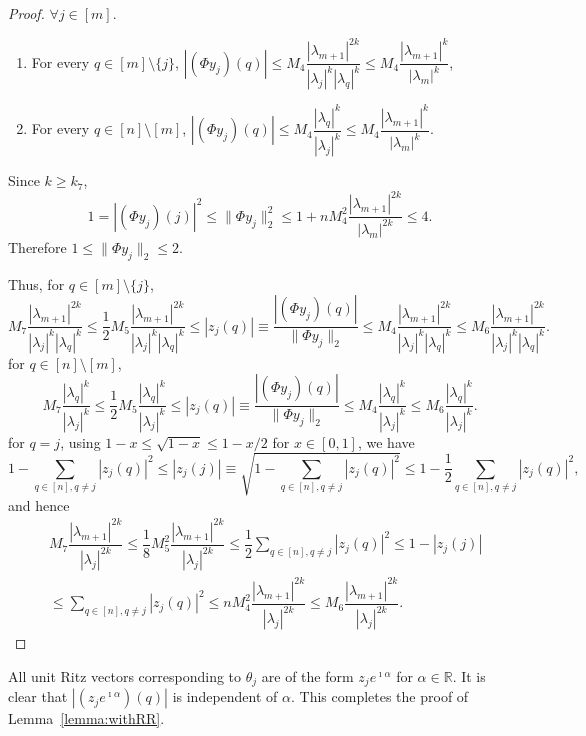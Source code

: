 \documentclass[11pt,a4paper]{article}
\theoremstyle{plain}              %
\theoremstyle{definition}         %
\begin{document}
\begin{proof}
\(\forall j\in[m]\).
\begin{enumerate}
\item For every \(q\in[m]\setminus\{j\}\), \(|(\Phi y_j)(q)|\leq M_4\dfrac{|\lambda_{m+1}|^{2k}}{|\lambda_j|^k|\lambda_q|^k}\leq M_4\dfrac{|\lambda_{m+1}|^k}{|\lambda_m|^k}\),
\item For every \(q\in[n]\setminus[m]\), \(|(\Phi y_j)(q)|\leq M_4\dfrac{|\lambda_q|^k}{|\lambda_j|^k}\leq M_4\dfrac{|\lambda_{m+1}|^k}{|\lambda_m|^k}\).
\end{enumerate}

Since \(k\geq k_7\),
\[
1=|(\Phi y_j)(j)|^2\leq\|\Phi y_j\|_2^2\leq 1+nM_4^2\dfrac{|\lambda_{m+1}|^{2k}}{|\lambda_m|^{2k}}\leq 4.
\]
Therefore \(1\leq\|\Phi y_j\|_2\leq 2\).

Thus, for \(q\in[m]\setminus\{j\}\),
\[
M_7\dfrac{|\lambda_{m+1}|^{2k}}{|\lambda_j|^k|\lambda_q|^k}\leq\dfrac{1}{2}M_5\dfrac{|\lambda_{m+1}|^{2k}}{|\lambda_j|^k|\lambda_q|^k}\leq|z_j(q)|\equiv\dfrac{|(\Phi y_j)(q)|}{\|\Phi y_j\|_2}\leq M_4\dfrac{|\lambda_{m+1}|^{2k}}{|\lambda_j|^k|\lambda_q|^k}\leq M_6\dfrac{|\lambda_{m+1}|^{2k}}{|\lambda_j|^k|\lambda_q|^k}.
\]
for \(q\in[n]\setminus[m]\),
\[
M_7\dfrac{|\lambda_q|^k}{|\lambda_j|^k}\leq\dfrac{1}{2}M_5\dfrac{|\lambda_q|^k}{|\lambda_j|^k}\leq|z_j(q)|\equiv\dfrac{|(\Phi y_j)(q)|}{\|\Phi y_j\|_2}\leq M_4\dfrac{|\lambda_q|^k}{|\lambda_j|^k}\leq M_6\dfrac{|\lambda_q|^k}{|\lambda_j|^k}.
\]
for \(q=j\), using \(1-x\leq\sqrt{1-x}\leq1-x/2\) for \(x\in[0,1]\), we have
\[
1-\sum_{q\in[n],q\neq j}|z_j(q)|^2\leq|z_j(j)|\equiv\sqrt{1-\sum_{q\in[n],q\neq j}|z_j(q)|^2}\leq 1-\dfrac{1}{2}\sum_{q\in[n],q\neq j}|z_j(q)|^2,
\]
and hence
\begin{align*}
&M_7\dfrac{|\lambda_{m+1}|^{2k}}{|\lambda_j|^{2k}}\leq\dfrac{1}{8}M_5^2\dfrac{|\lambda_{m+1}|^{2k}}{|\lambda_j|^{2k}}\leq\dfrac{1}{2}\sum_{q\in[n],q\neq j}|z_j(q)|^2\leq1-|z_j(j)|\\
&\leq\sum_{q\in[n],q\neq j}|z_j(q)|^2\leq nM_4^2\dfrac{|\lambda_{m+1}|^{2k}}{|\lambda_j|^{2k}}\leq M_6\dfrac{|\lambda_{m+1}|^{2k}}{|\lambda_j|^{2k}}.
\end{align*}
\end{proof}

All unit Ritz vectors corresponding to \(\theta_j\) are of the form \(z_je^{\imath\alpha}\) for \(\alpha\in\mathbb{R}\). It is clear that \(|(z_je^{\imath\alpha})(q)|\) is independent of \(\alpha\). This completes the proof of Lemma~\ref{lemma:withRR}.
\end{document}
